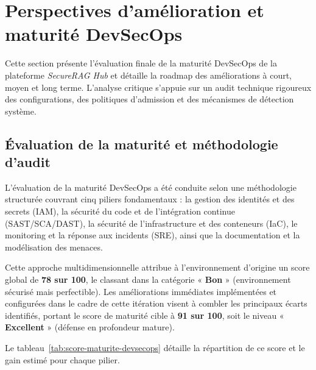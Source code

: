 \section{Perspectives d'amélioration et maturité DevSecOps}
\label{sec:perspectives-amelioration-maturite}

Cette section présente l'évaluation finale de la maturité DevSecOps de la plateforme \textit{SecureRAG Hub} et détaille la roadmap des améliorations à court, moyen et long terme. L'analyse critique s'appuie sur un audit technique rigoureux des configurations, des politiques d'admission et des mécanismes de détection système.

\subsection{Évaluation de la maturité et méthodologie d'audit}
\label{subsec:evaluation-maturite}

L'évaluation de la maturité DevSecOps a été conduite selon une méthodologie structurée couvrant cinq piliers fondamentaux : la gestion des identités et des secrets (IAM), la sécurité du code et de l'intégration continue (SAST/SCA/DAST), la sécurité de l'infrastructure et des conteneurs (IaC), le monitoring et la réponse aux incidents (SRE), ainsi que la documentation et la modélisation des menaces.

Cette approche multidimensionnelle attribue à l'environnement d'origine un score global de \textbf{78 sur 100}, le classant dans la catégorie « \textbf{Bon} » (environnement sécurisé mais perfectible). Les améliorations immédiates implémentées et configurées dans le cadre de cette itération visent à combler les principaux écarts identifiés, portant le score de maturité cible à \textbf{91 sur 100}, soit le niveau « \textbf{Excellent} » (défense en profondeur mature).

Le tableau~\ref{tab:score-maturite-devsecops} détaille la répartition de ce score et le gain estimé pour chaque pilier.

